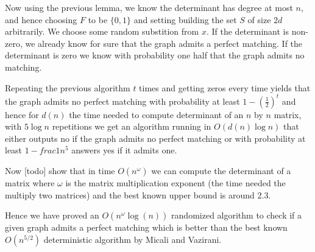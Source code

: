 	Now using the previous lemma, we know the determinant has degree at most $n$, and hence choosing $F$ to be $\{0, 1\}$ and setting building the set $S$ of size $2d$ arbitrarily. We choose some random substition from $x$. If the determinant is non-zero, we already know for sure that the graph admits a perfect matching. If the determinant is zero we know with probability one half that the graph admits no matching.

	Repeating the previous algorithm $t$ times and getting zeros every time yields that the graph admits no perfect matching with probability at least $1 - (\frac{1}{2})^t$ and hence for $d(n)$ the time needed to compute determinant of an $n$ by $n$ matrix, with $5 \log n$ repetitions we get an algorithm running in $O(d(n) \log n)$ that either outputs no if the graph admits no perfect matching or with probability at least $1 - frac{1}{n^5}$ answers yes if it admits one.

	Now [todo] show that in time $O(n^\omega)$ we can compute the determinant of a matrix where $\omega$ is the matrix multiplication exponent (the time needed the multiply two matrices) and the best known upper bound is around 2.3.

	Hence we have proved an $O(n^{\omega} \log(n))$ randomized algorithm to check if a given graph admits a perfect matching which is better than the best known $O(n^{5/2})$ deterministic algorithm by Micali and Vazirani.

